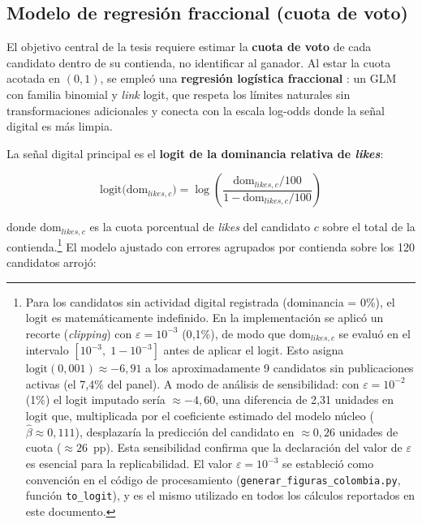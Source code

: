\subsection{Modelo de regresión fraccional (cuota de voto)}

El objetivo central de la tesis requiere estimar la \textbf{cuota de voto} de cada candidato dentro de su contienda, no identificar al ganador. Al estar la cuota acotada en $(0,1)$, se empleó una \textbf{regresión logística fraccional} \parencite{papke1996}: un GLM con familia binomial y \textit{link} logit, que respeta los límites naturales sin transformaciones adicionales y conecta con la escala log-odds donde la señal digital es más limpia.

La señal digital principal es el \textbf{logit de la dominancia relativa de \textit{likes}}:

\begin{equation}
    \text{logit}\bigl(\text{dom}_{likes,c}\bigr) = \log\!\left(\frac{\text{dom}_{likes,c}/100}{1 - \text{dom}_{likes,c}/100}\right)
    \label{eq:logit-dom}
\end{equation}

donde $\text{dom}_{likes,c}$ es la cuota porcentual de \textit{likes} del candidato $c$ sobre el total de la contienda.\footnote{Para los candidatos sin actividad digital registrada (dominancia = 0\%), el logit es matemáticamente indefinido. En la implementación se aplicó un recorte (\textit{clipping}) con $\varepsilon = 10^{-3}$ (0{,}1\%), de modo que $\text{dom}_{likes,c}$ se evaluó en el intervalo $[10^{-3},\; 1-10^{-3}]$ antes de aplicar el logit. Esto asigna $\text{logit}(0{,}001) \approx -6{,}91$ a los aproximadamente 9 candidatos sin publicaciones activas (el 7{,}4\% del panel). A modo de análisis de sensibilidad: con $\varepsilon = 10^{-2}$ (1\%) el logit imputado sería $\approx -4{,}60$, una diferencia de 2{,}31 unidades en logit que, multiplicada por el coeficiente estimado del modelo núcleo ($\hat{\beta} \approx 0{,}111$), desplazaría la predicción del candidato en $\approx 0{,}26$ unidades de cuota ($\approx 26$~pp). Esta sensibilidad confirma que la declaración del valor de $\varepsilon$ es esencial para la replicabilidad. El valor $\varepsilon = 10^{-3}$ se estableció como convención en el código de procesamiento (\texttt{generar\_figuras\_colombia.py}, función \texttt{to\_logit}), y es el mismo utilizado en todos los cálculos reportados en este documento.} El modelo ajustado con errores agrupados por contienda sobre los 120 candidatos arrojó:

